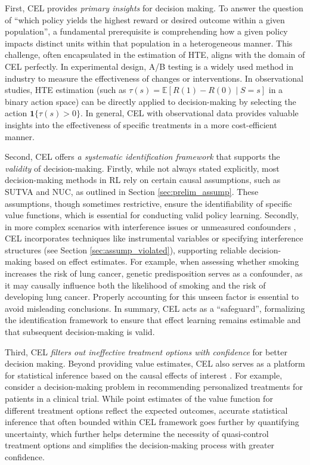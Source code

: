 First, \acrshort{CEL} provides \textit{primary insights} for decision making.
To answer the question of  ``which policy yields the highest reward or desired outcome within a given population'', a fundamental prerequisite is comprehending how a given policy impacts distinct units within that population in a heterogeneous manner. This challenge, often encapsulated in the estimation of \acrshort{HTE}, aligns with the domain of \acrshort{CEL} perfectly.  %
In experimental design, A/B testing is a widely used method in industry to measure the effectiveness of changes or interventions. In observational studies, \acrshort{HTE} estimation (such as $\tau(s) = \mathbb{E}[R(1)- R(0)\mid S = s]$ in a binary action space) can be directly applied to decision-making by selecting the action $\boldsymbol{1}\{\tau(s) > 0\}$. In general, \acrshort{CEL} with observational data provides valuable insights into the effectiveness of specific treatments in a more cost-efficient manner.


Second, \acrshort{CEL} offers \textit{a systematic identification framework} that supports the \textit{validity} of decision-making.
Firstly, while not always stated explicitly, most decision-making methods in \acrshort{RL} rely on certain causal assumptions, such as \acrshort{SUTVA} and \acrshort{NUC}, as outlined in Section \ref{sec:prelim_assump}. These assumptions, though sometimes restrictive, ensure the identifiability of specific value functions, which is essential for conducting valid policy learning. Secondly, in more complex scenarios with interference issues \citep{savje2021average} or unmeasured confounders \citep{wang2018bounded}, \acrshort{CEL} incorporates techniques like instrumental variables or specifying interference structures (see Section \ref{sec:assump_violated}), supporting reliable decision-making based on effect estimates. For example, when assessing whether smoking increases the risk of lung cancer, genetic predisposition serves as a confounder, as it may causally influence both the likelihood of smoking and the risk of developing lung cancer. Properly accounting for this unseen factor is essential to avoid misleading conclusions.
In summary, \acrshort{CEL} acts as a ``safeguard'', formalizing the identification framework to ensure that effect learning remains estimable and that subsequent decision-making is valid.

Third, \acrshort{CEL} \textit{filters out ineffective treatment options with confidence} for better decision making.
Beyond providing value estimates, \acrshort{CEL} also serves as a platform for statistical inference based on the causal effects of interest \citep{mealli2011statistical,benkeser2017doubly,athey2018approximate,xu2022quantile}. For example, consider a decision-making problem in recommending personalized treatments for patients in a clinical trial. While point estimates of the value function for different treatment options reflect the expected outcomes, accurate statistical inference that often bounded within \acrshort{CEL} framework goes further by quantifying uncertainty, which further helps determine the necessity of quasi-control treatment options and simplifies the decision-making process with greater confidence.

